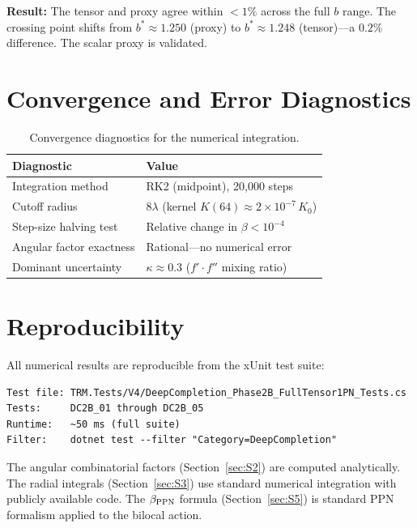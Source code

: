 \documentclass[aps,prd,onecolumn,superscriptaddress]{revtex4-2}
\begin{document}
\textbf{Result:} The tensor and proxy agree within $<1\%$ across the full $b$ range. The crossing point shifts from $b^* \approx 1.250$ (proxy) to $b^* \approx 1.248$ (tensor)---a $0.2\%$ difference. The scalar proxy is validated.

\section{Convergence and Error Diagnostics}
\label{sec:S7}

\begin{table}[h]
\centering
\begin{tabular}{l|l}
Diagnostic & Value \\
\midrule
Integration method & RK2 (midpoint), 20,000 steps \\
Cutoff radius & $8\lambda$ (kernel $K(64) \approx 2\times 10^{-7}\,K_0$) \\
Step-size halving test & Relative change in $\beta < 10^{-4}$ \\
Angular factor exactness & Rational---no numerical error \\
Dominant uncertainty & $\kappa \approx 0.3$ ($f'\cdot f''$ mixing ratio) \\
\end{tabular}
\caption{Convergence diagnostics for the numerical integration.}
\label{tab:convergence}
\end{table}

\section{Reproducibility}
\label{sec:S8}

All numerical results are reproducible from the xUnit test suite:

\begin{verbatim}
Test file: TRM.Tests/V4/DeepCompletion_Phase2B_FullTensor1PN_Tests.cs
Tests:     DC2B_01 through DC2B_05
Runtime:   ~50 ms (full suite)
Filter:    dotnet test --filter "Category=DeepCompletion"
\end{verbatim}

The angular combinatorial factors (Section~\ref{sec:S2}) are computed analytically. The radial integrals (Section~\ref{sec:S3}) use standard numerical integration with publicly available code. The $\beta_{\rm PPN}$ formula (Section~\ref{sec:S5}) is standard PPN formalism applied to the bilocal action.
\end{document}
